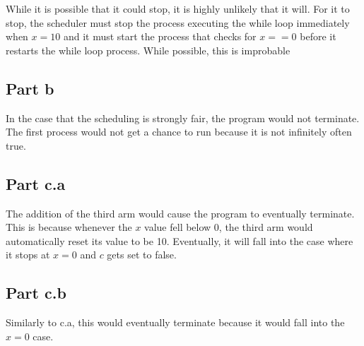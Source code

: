 \documentclass{article}%
\begin{document}
While it is possible that it could stop, it is highly unlikely that it will. For it to stop, the scheduler must stop the process executing the while loop immediately when $x=10$ and it must start the process that checks for $x==0$ before it restarts the while loop process. While possible, this is improbable

\subsection{Part b}

In the case that the scheduling is strongly fair, the program would not terminate. The first process would not get a chance to run because it is not infinitely often true.

\subsection{Part c.a}
The addition of the third arm would cause the program to eventually terminate. This is because whenever the $x$ value fell below 0, the third arm would automatically reset its value to be 10. Eventually, it will fall into the case where it stops at $x=0$ and $c$ gets set to false.

\subsection{Part c.b}

Similarly to c.a, this would eventually terminate because it would fall into the $x=0$ case.
\end{document}
